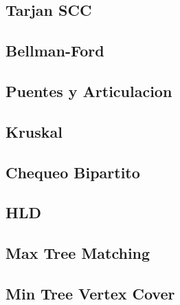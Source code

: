 \documentclass[a4paper,11pt,landscape,twocolumn]{article}
\begin{document}


\subsection{Tarjan SCC}



\subsection{Bellman-Ford}



\subsection{Puentes y Articulacion}



\subsection{Kruskal}



\subsection{Chequeo Bipartito}



\subsection{HLD}



\subsection{Max Tree Matching}



\subsection{Min Tree Vertex Cover}


\end{document}
